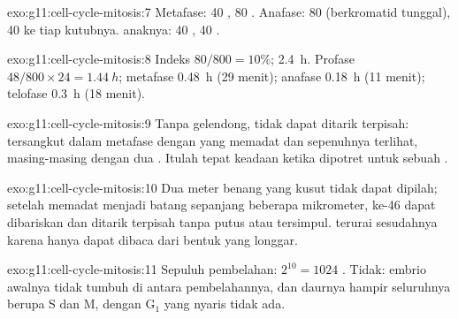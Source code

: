 \begin{solution}{exo:g11:cell-cycle-mitosis:7}
Metafase: 40 , 80 . Anafase: 80  (berkromatid
tunggal), 40 ke tiap kutubnya.  anaknya: 40 , 40 .
\end{solution}

\begin{solution}{exo:g11:cell-cycle-mitosis:8}
Indeks  $80/800 = 10\%$;  \qty{2.4}{h}. Profase
$48/800 \times 24 = \qty{1.44}{h}$; metafase \qty{0.48}{h} (29 menit);
anafase \qty{0.18}{h} (11 menit); telofase \qty{0.3}{h} (18 menit).
\end{solution}

\begin{solution}{exo:g11:cell-cycle-mitosis:9}
Tanpa gelendong,  tidak dapat ditarik terpisah: 
tersangkut dalam metafase dengan  yang memadat dan
sepenuhnya terlihat, masing-masing dengan dua . Itulah tepat
keadaan ketika  dipotret untuk sebuah .
\end{solution}

\begin{solution}{exo:g11:cell-cycle-mitosis:10}
Dua meter benang yang kusut tidak dapat dipilah; setelah memadat
menjadi batang sepanjang beberapa mikrometer, ke-46  dapat
dibariskan dan ditarik terpisah tanpa putus atau tersimpul. 
terurai sesudahnya karena  hanya dapat dibaca dari bentuk yang longgar.
\end{solution}

\begin{solution}{exo:g11:cell-cycle-mitosis:11}
Sepuluh pembelahan: $2^{10} = 1024$ . Tidak: embrio awalnya tidak
tumbuh di antara pembelahannya, dan daurnya hampir seluruhnya berupa S
dan M, dengan $\mathrm{G_1}$ yang nyaris tidak ada.
\end{solution}

